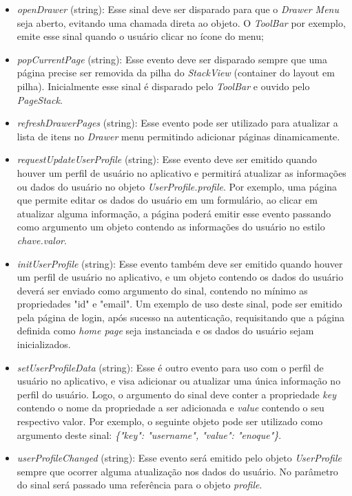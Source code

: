 \begin{itemize}
\begin{itemize}
		\item \textit{openDrawer} (string): Esse sinal deve ser disparado para que o \textit{Drawer Menu} seja aberto, evitando uma chamada direta ao objeto. O \textit{ToolBar} por exemplo, emite esse sinal quando o usuário clicar no ícone do menu;

		\item \textit{popCurrentPage} (string): Esse evento deve ser disparado sempre que uma página precise ser removida da pilha do \textit{StackView} (container do layout em pilha). Inicialmente esse sinal é disparado pelo \textit{ToolBar} e ouvido pelo \textit{PageStack}.

		\item \textit{refreshDrawerPages} (string): Esse evento pode ser utilizado para atualizar a lista de itens no \textit{Drawer} menu permitindo adicionar páginas dinamicamente.

		\item \textit{requestUpdateUserProfile} (string): Esse evento deve ser emitido quando houver um perfil de usuário no aplicativo e permitirá atualizar as informações ou dados do usuário no objeto \textit{UserProfile.profile}. Por exemplo, uma página que permite editar os dados do usuário em um formulário, ao clicar em atualizar alguma informação, a página poderá emitir esse evento passando como argumento um objeto contendo as informações do usuário no estilo \textit{chave.valor}.

		\item \textit{initUserProfile} (string): Esse evento também deve ser emitido quando houver um perfil de usuário no aplicativo, e um objeto contendo os dados do usuário deverá ser enviado como argumento do sinal, contendo no mínimo as propriedades "id" e "email". Um exemplo de uso deste sinal, pode ser emitido pela página de login, após sucesso na autenticação, requisitando que a página definida como \textit{home page} seja instanciada e os dados do usuário sejam inicializados.

		\item \textit{setUserProfileData} (string): Esse é outro evento para uso com o perfil de usuário no aplicativo, e visa adicionar ou atualizar uma única informação no perfil do usuário. Logo, o argumento do sinal deve conter a propriedade \textit{key} contendo o nome da propriedade a ser adicionada e \textit{value} contendo o seu respectivo valor. Por exemplo, o seguinte objeto pode ser utilizado como argumento deste sinal: \textit{\{"key": "username", "value": "enoque"\}}.

		\item \textit{userProfileChanged} (string): Esse evento será emitido pelo objeto \textit{UserProfile} sempre que ocorrer alguma atualização nos dados do usuário. No parâmetro do sinal será passado uma referência para o objeto \textit{profile}.
	\end{itemize}
\end{itemize}

